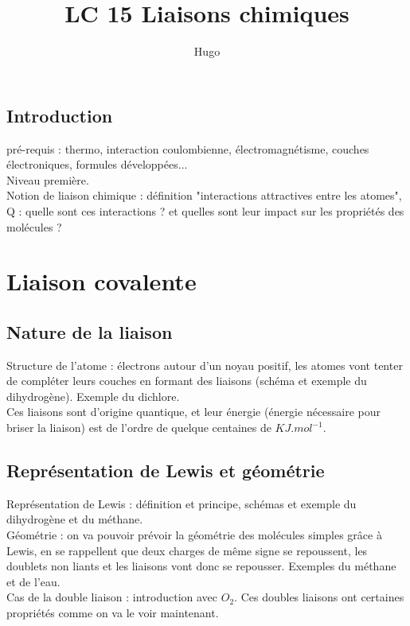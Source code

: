 \documentclass[12pt,prb,aps,epsf]{article}
\begin{document}
	
	\title{LC 15 Liaisons chimiques}
	\author{Hugo}
	
	\maketitle
	
	\tableofcontents
	
	\pagebreak
	
	
\subsection{Introduction}
pré-requis : thermo, interaction coulombienne, électromagnétisme, couches électroniques, formules développées...\\
Niveau première.\\
Notion de liaison chimique : définition "interactions attractives entre les atomes",\\ Q : quelle sont ces interactions ? et quelles sont leur impact sur les propriétés des molécules ?

\section{Liaison covalente}
\subsection{Nature de la liaison}
	Structure de l'atome : électrons autour d'un noyau positif, les atomes vont tenter de compléter leurs couches en formant des liaisons (schéma et exemple du dihydrogène). Exemple du dichlore.\\
	Ces liaisons sont d'origine quantique, et leur énergie (énergie nécessaire pour briser la liaison) est de l'ordre de quelque centaines de $KJ.mol^{-1}$.
	
\subsection{Représentation de Lewis et géométrie}
	Représentation de Lewis : définition et principe, schémas et exemple du dihydrogène et du méthane.\\
	Géométrie : on va pouvoir prévoir la géométrie des molécules simples grâce à Lewis, en se rappellent que deux charges de même signe se repoussent, les doublets non liants et les liaisons vont donc se repousser. Exemples du méthane et de l'eau.\\
	Cas de la double liaison : introduction avec $O_2$. Ces doubles liaisons ont certaines propriétés comme on va le voir maintenant.
	
\end{document}
